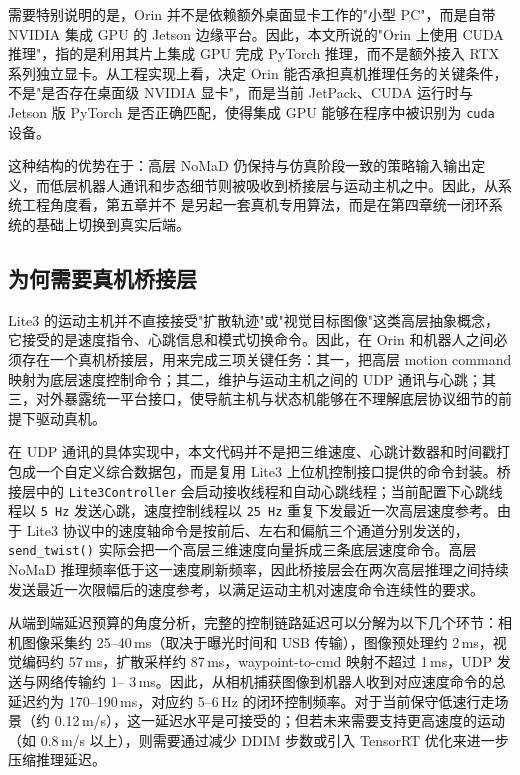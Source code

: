 需要特别说明的是，Orin 并不是依赖额外桌面显卡工作的"小型 PC"，而是自带 NVIDIA 集成 GPU 的 Jetson 边缘平台。因此，本文所说的"Orin
上使用 CUDA 推理"，指的是利用其片上集成 GPU 完成 PyTorch 推理，而不是额外接入 RTX 系列独立显卡。从工程实现上看，决定 Orin
能否承担真机推理任务的关键条件，不是"是否存在桌面级 NVIDIA 显卡"，而是当前 JetPack、CUDA 运行时与 Jetson 版 PyTorch
是否正确匹配，使得集成 GPU 能够在程序中被识别为 \texttt{cuda} 设备。

这种结构的优势在于：高层 NoMaD 仍保持与仿真阶段一致的策略输入输出定义，而低层机器人通讯和步态细节则被吸收到桥接层与运动主机之中。因此，从系统工程角度看，第五章并不
是另起一套真机专用算法，而是在第四章统一闭环系统的基础上切换到真实后端。

\subsection{为何需要真机桥接层}

Lite3 的运动主机并不直接接受"扩散轨迹"或"视觉目标图像"这类高层抽象概念，它接受的是速度指令、心跳信息和模式切换命令。因此，在 Orin
和机器人之间必须存在一个真机桥接层，用来完成三项关键任务：其一，把高层 motion command 映射为底层速度控制命令；其二，维护与运动主机之间的 UDP
通讯与心跳；其三，对外暴露统一平台接口，使导航主机与状态机能够在不理解底层协议细节的前提下驱动真机。

在 UDP 通讯的具体实现中，本文代码并不是把三维速度、心跳计数器和时间戳打包成一个自定义综合数据包，而是复用 Lite3 上位机控制接口提供的命令封装。桥接层中的 \texttt{Lite3Controller} 会启动接收线程和自动心跳线程；当前配置下心跳线程以 \texttt{5\,Hz} 发送心跳，速度控制线程以 \texttt{25\,Hz} 重复下发最近一次高层速度参考。由于 Lite3 协议中的速度轴命令是按前后、左右和偏航三个通道分别发送的，\texttt{send\_twist()} 实际会把一个高层三维速度向量拆成三条底层速度命令。高层 NoMaD 推理频率低于这一速度刷新频率，因此桥接层会在两次高层推理之间持续发送最近一次限幅后的速度参考，以满足运动主机对速度命令连续性的要求。

从端到端延迟预算的角度分析，完整的控制链路延迟可以分解为以下几个环节：相机图像采集约 25--40\,ms（取决于曝光时间和 USB 传输），图像预处理约
2\,ms，视觉编码约 57\,ms，扩散采样约 87\,ms，waypoint-to-cmd 映射不超过 1\,ms，UDP 发送与网络传输约 1--
3\,ms。因此，从相机捕获图像到机器人收到对应速度命令的总延迟约为 170--190\,ms，对应约 5--6\,Hz 的闭环控制频率。对于当前保守低速行走场景（约 0.12\,m/s），这一延迟水平是可接受的；但若未来需要支持更高速度的运动（如 0.8\,m/s 以上），则需要通过减少 DDIM 步数或引入 TensorRT
优化来进一步压缩推理延迟。

